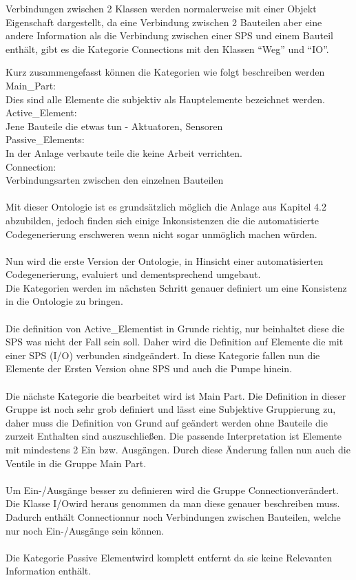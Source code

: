 Verbindungen zwischen 2 Klassen werden normalerweise mit einer Objekt Eigenschaft dargestellt, da eine Verbindung zwischen 2 Bauteilen aber eine andere Information als die Verbindung zwischen einer SPS und einem Bauteil enthält, gibt es die Kategorie Connections mit den Klassen “Weg” und “IO”.

Kurz zusammengefasst können die Kategorien wie folgt beschreiben werden\\
Main\_Part:\\
	Dies sind alle Elemente die subjektiv als Hauptelemente bezeichnet werden.\\
Active\_Element:\\
	Jene Bauteile die etwas tun - Aktuatoren, Sensoren\\
Passive\_Elements:\\
	In der Anlage verbaute teile die keine Arbeit verrichten.\\ 
Connection:\\
	Verbindungsarten zwischen den einzelnen Bauteilen\\
\\
Mit dieser Ontologie ist es grundsätzlich möglich die Anlage aus Kapitel 4.2 abzubilden, jedoch finden sich einige Inkonsistenzen die die automatisierte Codegenerierung erschweren wenn nicht sogar unmöglich machen würden.\\
\\
Nun wird die erste Version der Ontologie, in Hinsicht einer automatisierten Codegenerierung, evaluiert und dementsprechend umgebaut.\\
Die Kategorien werden im nächsten Schritt genauer definiert um eine Konsistenz in die Ontologie zu bringen.\\
\\
Die definition von \glqq Active\_Element\grqq\space ist in Grunde richtig, nur beinhaltet diese die SPS was nicht der Fall sein soll. Daher wird die Definition auf \glqq Elemente die mit einer SPS (I/O) verbunden sind\grqq\space geändert. In diese Kategorie fallen nun die Elemente der Ersten Version ohne SPS und auch die Pumpe hinein.\\
\\
Die nächste Kategorie die bearbeitet wird ist \glqq Main Part\grqq\space. Die Definition in dieser Gruppe ist noch sehr grob definiert und lässt eine Subjektive Gruppierung zu, daher muss die Definition von Grund auf geändert werden ohne Bauteile die zurzeit Enthalten sind auszuschließen. Die passende Interpretation ist \glqq Elemente mit mindestens 2 Ein bzw. Ausgängen\grqq\space. Durch diese Änderung fallen nun auch die Ventile in die Gruppe \glqq Main Part\grqq\space.\\
\\
Um Ein-/Ausgänge besser zu definieren wird die Gruppe \glqq Connection\grqq\space verändert. Die Klasse \glqq I/O\grqq\space wird heraus genommen da man diese genauer beschreiben muss. Dadurch enthält \glqq Connection\grqq\space nur noch Verbindungen zwischen Bauteilen, welche nur noch Ein-/Ausgänge sein können.\\
\\
Die Kategorie \glqq Passive Element\grqq\space wird komplett entfernt da sie keine Relevanten Information enthält.

